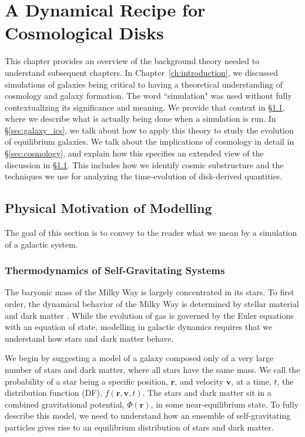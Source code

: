 \newcommand{\deriv}[3][]{%
  \ensuremath{\frac{\partial^{#1} {#2}}{\partial {#3}^{#1}}}}
\newtheorem{theorem}{Theorem}[section]

\chapter{A Dynamical Recipe for Cosmological Disks}\label{ch:background}
\newpage

This chapter provides an overview of the background theory needed to understand subsequent chapters. In Chapter~\ref{ch:introduction}, we discussed simulations of galaxies being critical to having a theoretical understanding of cosmology and galaxy formation. The word ``simulation" was used without fully contextualizing its significance and meaning. We provide that context in \S\ref{sec:motivation}, where we describe what is actually being done when a simulation is run. In \S\ref{sec:galaxy_ics}, we talk about how to apply this theory to study the evolution of equilibrium galaxies.  We talk about  the implications of cosmology in detail in \S\ref{sec:cosmology}, and explain how this specifies an extended view of the discussion in \S\ref{sec:motivation}. This includes how we identify cosmic substructure and the techniques we use for analyzing the time-evolution of disk-derived quantities. 
\section{Physical Motivation of Modelling} \label{sec:motivation}

The goal of this section is to convey to the reader what we mean by a simulation of a galactic system. 

\subsection{Thermodynamics of Self-Gravitating Systems}

The baryonic mass of the Milky Way is largely concentrated in its stars. To first order, the dynamical behavior of the Milky Way is determined by stellar material and dark matter \citep{BM}. While the evolution of gas is governed by the Euler equations with an equation of state, modelling in galactic dynamics requires that we understand how stars and dark matter behave. 

We begin by suggesting a model of a galaxy composed only of a very large number of stars and dark matter, where all stars have the same mass. We call the probability of a star being a specific position, $\textbf{r}$, and velocity $\textbf{v}$, at a time, $t$, the distribution function (DF), $f(\textbf{r},\textbf{v},t)$. The stars and dark matter sit in a combined gravitational potential, $\Phi(\textbf{r})$, in some near-equilibrium state. To fully describe this model, we need to understand how an ensemble of self-gravitating particles gives rise to an equilibrium distribution of stars and dark matter.

